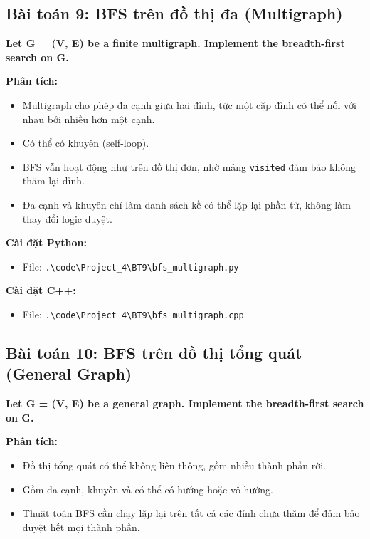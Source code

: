 \documentclass[12pt,a4paper]{article}
\begin{document}
\subsection{Bài toán 9: BFS trên đồ thị đa (Multigraph)}

\begin{problembox}
    \textbf{Let G = (V, E) be a finite multigraph. Implement the breadth-first search on G.} 
\end{problembox}

\textbf{Phân tích:}
\begin{itemize}[label=\textbullet]
    \item Multigraph cho phép đa cạnh giữa hai đỉnh, tức một cặp đỉnh có thể nối với nhau bởi nhiều hơn một cạnh.
    \item Có thể có khuyên (self-loop).
    \item BFS vẫn hoạt động như trên đồ thị đơn, nhờ mảng \texttt{visited} đảm bảo không thăm lại đỉnh.
    \item Đa cạnh và khuyên chỉ làm danh sách kề có thể lặp lại phần tử, không làm thay đổi logic duyệt.
\end{itemize}

\textbf{Cài đặt Python:}
\begin{itemize}[label=\textbullet]
   \item File: \texttt{.\textbackslash code\textbackslash Project\_4\textbackslash BT9\textbackslash bfs\_multigraph.py}
\end{itemize}

\textbf{Cài đặt C++:}
\begin{itemize}[label=\textbullet]
   \item File: \texttt{.\textbackslash code\textbackslash Project\_4\textbackslash BT9\textbackslash bfs\_multigraph.cpp}
\end{itemize}



\subsection{Bài toán 10: BFS trên đồ thị tổng quát (General Graph)}

\begin{problembox}
    \textbf{Let G = (V, E) be a general graph. Implement the breadth-first search on G.} 
\end{problembox}

\textbf{Phân tích:}
\begin{itemize}[label=\textbullet]
    \item Đồ thị tổng quát có thể không liên thông, gồm nhiều thành phần rời.
    \item Gồm đa cạnh, khuyên và có thể có hướng hoặc vô hướng.
    \item Thuật toán BFS cần chạy lặp lại trên tất cả các đỉnh chưa thăm để đảm bảo duyệt hết mọi thành phần.
\end{itemize}
\end{document}
